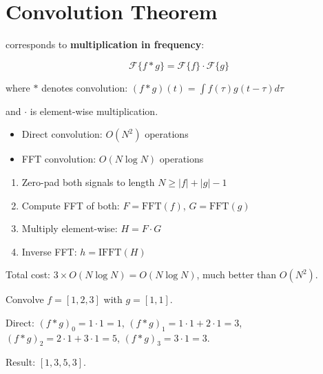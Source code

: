 \newpage
\section{Convolution Theorem}

 corresponds to \textbf{multiplication in frequency}:

\begin{equation}
    \boxed{\mathcal{F}\{f * g\} = \mathcal{F}\{f\} \cdot \mathcal{F}\{g\}}
\end{equation}

where $*$ denotes convolution: $(f * g)(t) = \int f(\tau) g(t - \tau) d\tau$

and $\cdot$ is element-wise multiplication.


\begin{itemize}
    \item Direct convolution: $O(N^2)$ operations
    \item FFT convolution: $O(N \log N)$ operations
\end{itemize}

\begin{enumerate}
    \item Zero-pad both signals to length $N \geq |f| + |g| - 1$
    \item Compute FFT of both: $F = \text{FFT}(f)$, $G = \text{FFT}(g)$
    \item Multiply element-wise: $H = F \cdot G$
    \item Inverse FFT: $h = \text{IFFT}(H)$
\end{enumerate}

Total cost: $3 \times O(N \log N) = O(N \log N)$, much better than $O(N^2)$.

 Convolve $f = [1, 2, 3]$ with $g = [1, 1]$.

Direct: $(f * g)_0 = 1 \cdot 1 = 1$, $(f * g)_1 = 1 \cdot 1 + 2 \cdot 1 = 3$, $(f * g)_2 = 2 \cdot 1 + 3 \cdot 1 = 5$, $(f * g)_3 = 3 \cdot 1 = 3$.

Result: $[1, 3, 5, 3]$.



